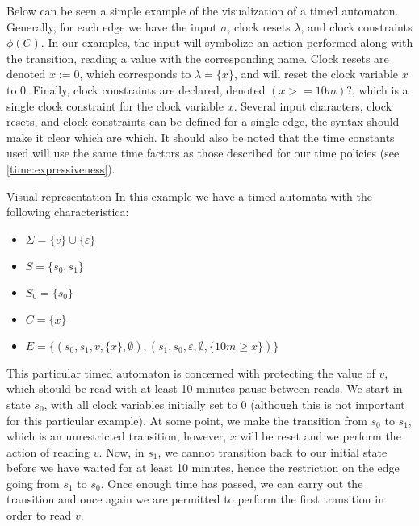 Below can be seen a simple example of the visualization of a timed automaton.
Generally, for each edge we have the input $\sigma$, clock resets $\lambda$, and clock constraints $\phi(C)$.
In our examples, the input will symbolize an action performed along with the transition, reading a value with the corresponding name.
Clock resets are denoted $x := 0$, which corresponds to $\lambda = \{ x \}$, and will reset the clock variable $x$ to 0.
Finally, clock constraints are declared, denoted $(x >= 10m)?$, which is a single clock constraint for the clock variable $x$.
Several input characters, clock resets, and clock constraints can be defined for a single edge, the syntax should make it clear which are which.
It should also be noted that the time constants used will use the same time factors as those described for our time policies (see \cref{time:expressiveness}).

\begin{example}{Visual representation}
In this example we have a timed automata with the following characteristica:
\begin{itemize}
  \item $\Sigma = \{ v \} \cup \{ \varepsilon \}$
  \item $S = \{ s_0, s_1 \}$
  \item $S_0 = \{ s_0 \}$
  \item $C = \{ x \}$
  \item $E = \{ (s_0, s_1, v, \{ x \}, \emptyset), (s_1, s_0, \varepsilon, \emptyset, \{ 10m \geq x \})\}$
\end{itemize}
This particular timed automaton is concerned with protecting the value of $v$, which should be read with at least 10 minutes pause between reads.
We start in state $s_0$, with all clock variables initially set to $0$ (although this is not important for this particular example).
At some point, we make the transition from $s_0$ to $s_1$, which is an unrestricted transition, however, $x$ will be reset and we perform the action of reading $v$.
Now, in $s_1$, we cannot transition back to our initial state before we have waited for at least 10 minutes, hence the restriction on the edge going from $s_1$ to $s_0$.
Once enough time has passed, we can carry out the transition and once again we are permitted to perform the first transition in order to read $v$.

\begin{centering}

\end{centering}
\end{example}
